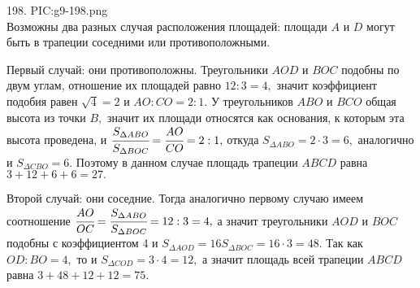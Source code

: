198. {{PIC:g9-198.png}}\\
Возможны два разных случая расположения площадей: площади $A$ и $D$ могут быть в трапеции соседними или противоположными.

Первый случай: они противоположны. Треугольники $AOD$ и $BOC$ подобны по двум углам, отношение их площадей равно $12:3=4,$ значит коэффициент подобия равен $\sqrt{4}=2$ и $AO:CO=2:1.$ У треугольников $ABO$ и $BCO$ общая высота из точки $B,$ значит их площади относятся как основания, к которым эта высота проведена, и $\cfrac{S_{\Delta ABO}}{S_{\Delta BOC}}=\cfrac{AO}{CO}=2:1,$ откуда $S_{\Delta ABO}=2\cdot3=6,$ аналогично и $S_{\Delta CBO}=6.$ Поэтому в данном случае площадь трапеции $ABCD$ равна $3+12+6+6=27.$

Второй случай: они соседние. Тогда аналогично первому случаю имеем соотношение $\cfrac{AO}{OC}=\cfrac{S_{\Delta ABO}}{S_{\Delta BOC}}=12:3=4,$ а значит треугольники $AOD$ и $BOC$ подобны с коэффициентом 4 и $S_{\Delta AOD}=16S_{\Delta BOC}=16\cdot3=48.$ Так как $OD:BO=4,$ то и $S_{\Delta COD}=3\cdot4=12,$ а значит площадь всей трапеции $ABCD$ равна $3+48+12+12=75.$\\
